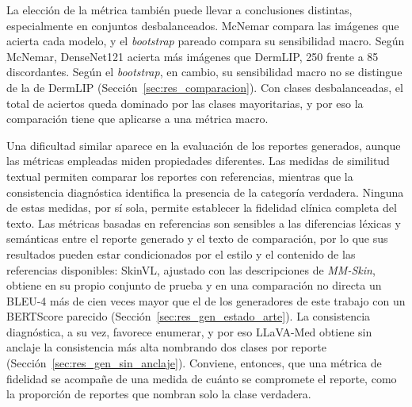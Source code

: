 La elección de la métrica también puede llevar a conclusiones distintas, especialmente en conjuntos desbalanceados. McNemar compara las imágenes que acierta cada modelo, y el \emph{bootstrap} pareado compara su sensibilidad macro. Según McNemar, DenseNet121 acierta más imágenes que DermLIP, 250 frente a 85 discordantes. Según el \emph{bootstrap}, en cambio, su sensibilidad macro no se distingue de la de DermLIP (Sección~\ref{sec:res_comparacion}). Con clases desbalanceadas, el total de aciertos queda dominado por las clases mayoritarias, y por eso la comparación tiene que aplicarse a una métrica macro.

Una dificultad similar aparece en la evaluación de los reportes generados, aunque las métricas empleadas miden propiedades diferentes. Las medidas de similitud textual permiten comparar los reportes con referencias, mientras que la consistencia diagnóstica identifica la presencia de la categoría verdadera. Ninguna de estas medidas, por sí sola, permite establecer la fidelidad clínica completa del texto. Las métricas basadas en referencias son sensibles a las diferencias léxicas y semánticas entre el reporte generado y el texto de comparación, por lo que sus resultados pueden estar condicionados por el estilo y el contenido de las referencias disponibles: SkinVL, ajustado con las descripciones de \emph{MM-Skin}, obtiene en su propio conjunto de prueba y en una comparación no directa un BLEU-4 más de cien veces
mayor que el de los generadores de este trabajo con un BERTScore parecido (Sección~\ref{sec:res_gen_estado_arte}). La
consistencia diagnóstica, a su vez, favorece enumerar, y por eso LLaVA-Med obtiene sin anclaje la consistencia más alta
nombrando dos clases por reporte (Sección~\ref{sec:res_gen_sin_anclaje}). Conviene, entonces, que una métrica de fidelidad se acompañe de una medida de cuánto se compromete el reporte, como la proporción de reportes que nombran solo la clase verdadera.

